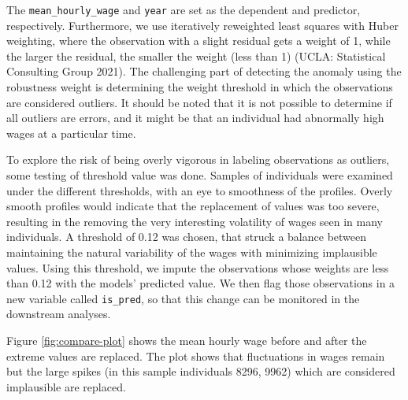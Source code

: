 \documentclass{article}
\begin{document}
The \texttt{mean\_hourly\_wage} and \texttt{year} are set as the dependent and predictor, respectively. Furthermore, we use iteratively reweighted least squares with Huber weighting, where the observation with a slight residual gets a weight of 1, while the larger the residual, the smaller the weight (less than 1) (UCLA: Statistical Consulting Group 2021). The challenging part of detecting the anomaly using the robustness weight is determining the weight threshold in which the observations are considered outliers. It should be noted that it is not possible to determine if all outliers are errors, and it might be that an individual had abnormally high wages at a particular time.

To explore the risk of being overly vigorous in labeling observations as outliers, some testing of threshold value was done. Samples of individuals were examined under the different thresholds, with an eye to smoothness of the profiles. Overly smooth profiles would indicate that the replacement of values was too severe, resulting in the removing the very interesting volatility of wages seen in many individuals. A threshold of 0.12 was chosen, that struck a balance between maintaining the natural variability of the wages with minimizing implausible values.
Using this threshold, we impute the observations whose weights are less than 0.12 with the models' predicted value. We then flag those observations in a new variable called \texttt{is\_pred}, so that this change can be monitored in the downstream analyses.

Figure \ref{fig:compare-plot} shows the mean hourly wage before and after the extreme values are replaced. The plot shows that fluctuations in wages remain but the large spikes (in this sample individuals 8296, 9962) which are considered implausible are replaced.
\end{document}
